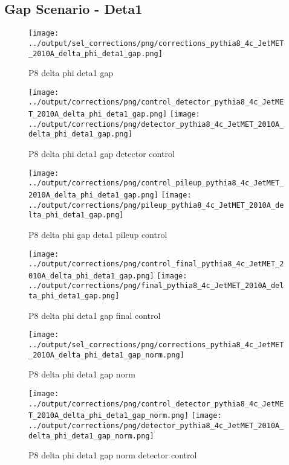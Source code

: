\documentclass[11pt]{book}
\begin{document}
\clearpage
\subsection{Gap Scenario - Deta1}
\begin{figure}[ht]
\centering
\texttt{[image: ../output/sel\_corrections/png/corrections\_pythia8\_4c\_JetMET\_2010A\_delta\_phi\_deta1\_gap.png]}
\caption{P8 delta phi deta1 gap}
\label{fig:p8_JetMET_2010A_delta_phi_deta1_gap}
\end{figure}

\begin{figure}[ht]
\centering
\texttt{[image: ../output/corrections/png/control\_detector\_pythia8\_4c\_JetMET\_2010A\_delta\_phi\_deta1\_gap.png]}
\texttt{[image: ../output/corrections/png/detector\_pythia8\_4c\_JetMET\_2010A\_delta\_phi\_deta1\_gap.png]}
\caption{P8 delta phi deta1 gap detector control}
\label{fig:p8_JetMET_2010A_delta_phi_deta1_gap_detector_control}
\end{figure}

\begin{figure}[ht]
\centering
\texttt{[image: ../output/corrections/png/control\_pileup\_pythia8\_4c\_JetMET\_2010A\_delta\_phi\_deta1\_gap.png]}
\texttt{[image: ../output/corrections/png/pileup\_pythia8\_4c\_JetMET\_2010A\_delta\_phi\_deta1\_gap.png]}
\caption{P8 delta phi gap deta1 pileup control}
\label{fig:p8_JetMET_2010A_delta_phi_deta1_gap_pileup_control}
\end{figure}


\begin{figure}[ht]
\centering
\texttt{[image: ../output/corrections/png/control\_final\_pythia8\_4c\_JetMET\_2010A\_delta\_phi\_deta1\_gap.png]}
\texttt{[image: ../output/corrections/png/final\_pythia8\_4c\_JetMET\_2010A\_delta\_phi\_deta1\_gap.png]}
\caption{P8 delta phi deta1 gap final control}
\label{fig:p8_JetMET_2010A_delta_phi_deta1_gap_final_control}
\end{figure}

\begin{figure}[ht]
\centering
\texttt{[image: ../output/sel\_corrections/png/corrections\_pythia8\_4c\_JetMET\_2010A\_delta\_phi\_deta1\_gap\_norm.png]}
\caption{P8 delta phi deta1 gap norm}
\label{fig:p8_JetMET_2010A_delta_phi_deta1_gap_norm}
\end{figure}

\begin{figure}[ht]
\centering
\texttt{[image: ../output/corrections/png/control\_detector\_pythia8\_4c\_JetMET\_2010A\_delta\_phi\_deta1\_gap\_norm.png]}
\texttt{[image: ../output/corrections/png/detector\_pythia8\_4c\_JetMET\_2010A\_delta\_phi\_deta1\_gap\_norm.png]}
\caption{P8 delta phi deta1 gap norm detector control}
\label{fig:p8_JetMET_2010A_delta_phi_deta1_gap_norm_detector_control}
\end{figure}
\end{document}
